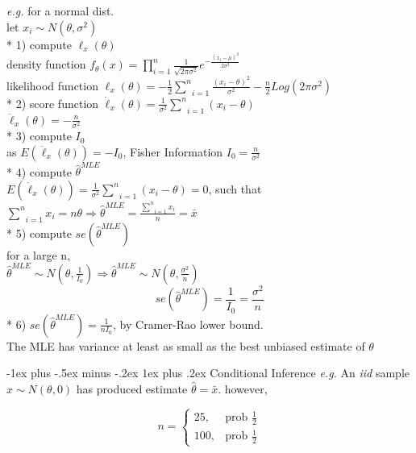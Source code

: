 \documentclass[10pt,landscape]{article}
\makeatletter
\renewcommand{\subsubsection}{\@startsection{subsubsection}{3}{0mm}%
                                {-1ex plus -.5ex minus -.2ex}%
                                {1ex plus .2ex}%
                                {\normalfont\small\bfseries}}
\makeatother
\begin{document}
\begin{multicols}{3}
\medskip
\emph{e.g.} for a normal dist. \\
let $x_i \sim N(\theta, \sigma^2)$ \\
* 1) compute ${\ell}_x(\theta)$ \\
density function $f_{\theta}(x) = \prod _{i=1}^n \frac{1}{\sqrt{2 \pi \sigma^2}} e^{-\frac{(x_i - \mu)^2}{2 \sigma^2}}$ \\
likelihood function ${\ell}_x(\theta) = -\frac{1}{2} \underset{i=1}{\overset{n}{\sum}} \frac{(x_i - \theta)^2}{\sigma^2} - \frac{n}{2} Log(2 \pi \sigma^2)$ \\
* 2) score function $\dot{\ell}_x(\theta) = \frac{1}{\sigma^2} \underset{i=1}{\overset{n}{\sum}} (x_i - \theta)$ \\
$\ddot{\ell}_x(\theta) = -\frac{n}{\sigma^2}$ \\
* 3) compute $I_0$ \\
as $E(\ddot{\ell}_x(\theta)) = - I_0$, Fisher Information $I_0 = \frac{n}{\sigma^2}$ \\
* 4) compute $\hat{\theta}^{MLE}$ \\
$E(\dot{\ell}_x(\theta)) = \frac{1}{\sigma^2} \underset{i=1}{\overset{n}{\sum}} (x_i - \theta) = 0$, such that \\
$\underset{i=1}{\overset{n}{\sum}} x_i = n \theta \Rightarrow \hat{\theta}^{MLE} = \frac{\underset{i=1}{\overset{n}{\sum}} x_i}{n} = \bar{x}$ \\
* 5) compute $se(\hat{\theta}^{MLE})$ \\
for a large n, \\
$\hat{\theta}^{MLE} \sim N\left(\theta,\frac{1}{I_0}\right) \Rightarrow \hat{\theta}^{MLE} \sim N\left(\theta,\frac{\sigma^2}{n}\right)$
$$ se(\hat{\theta}^{MLE}) = \frac{1}{I_0} = \frac{\sigma^2}{n} $$
* 6) $se(\hat{\theta}^{MLE}) = \frac{1}{n I_0}$, by Cramer-Rao lower bound. \\
The MLE has variance at least as small as the best unbiased estimate of $\theta$

\subsubsection{Conditional Inference}
\emph{e.g.} An \emph{iid} sample $x \sim N(\theta, 0)$ has produced estimate $\hat{\theta} = \bar{x}$. however,
\begin{multicols}{2}
$$
n = \begin{cases} 25, & \text{prob } \frac{1}{2} \\ 100, & \text{prob } \frac{1}{2} \end{cases}
$$


\end{multicols}
\end{multicols}
\end{document}
